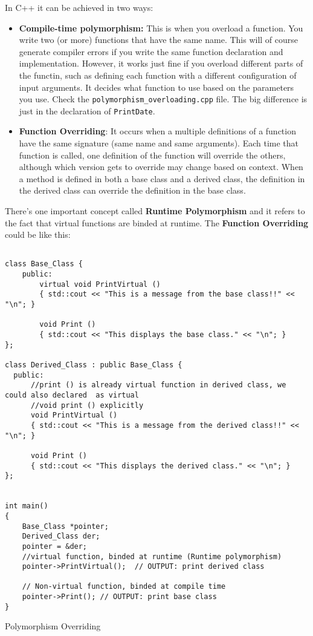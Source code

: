 \documentclass[11pt, a4paper]{article}
\begin{document}
In C++ it can be achieved in two ways:
\begin{itemize}
	\item \textbf{Compile-time polymorphism:} This is when you overload a function. You write two (or more) functions that have the same name. This will of course generate compiler errors if you write the same function declaration and implementation. However, it works just fine if you overload different parts of the functin, such as defining each function with a different configuration of input arguments.  It decides what function to use based on the parameters you use. Check the \texttt{polymorphism\_overloading.cpp} file.
		The big difference is just in the declaration of \texttt{PrintDate}.
	\item \textbf{Function Overriding}: It occurs when a multiple definitions of a function have the same signature (same name and same arguments). Each time that function is called, one definition of the function will override the others, although which version gets to override may change based on context.
		When a method is defined in both a base class and a derived class, the definition in the derived class can override the definition in the base class. 
\end{itemize}



There's one important concept called \textbf{Runtime Polymorphism} and it refers to the fact that virtual functions are binded at runtime. The \textbf{Function Overriding} could be like this:


\begin{listing}[hbt!]
\begin{verbatim}

class Base_Class {
    public:
        virtual void PrintVirtual () 
        { std::cout << "This is a message from the base class!!" << "\n"; }

        void Print () 
        { std::cout << "This displays the base class." << "\n"; }
};

class Derived_Class : public Base_Class {
  public:
      //print () is already virtual function in derived class, we could also declared  as virtual
      //void print () explicitly
      void PrintVirtual ()  
      { std::cout << "This is a message from the derived class!!" << "\n"; }

      void Print () 
      { std::cout << "This displays the derived class." << "\n"; }
};


int main()  
{
    Base_Class *pointer;
    Derived_Class der;
    pointer = &der;
    //virtual function, binded at runtime (Runtime polymorphism)
    pointer->PrintVirtual();  // OUTPUT: print derived class

    // Non-virtual function, binded at compile time
    pointer->Print(); // OUTPUT: print base class
}

\end{verbatim}
\caption{Polymorphism Overriding}
\label{lst:polymorphism_overriding}
\end{listing}
\end{document}
